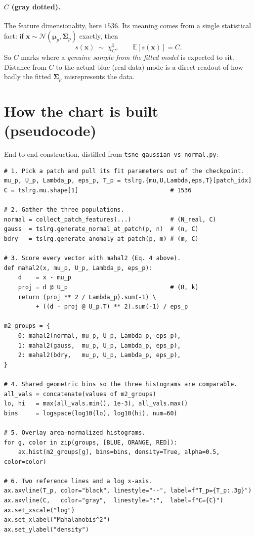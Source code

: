 \documentclass[11pt]{article}
\newcommand{\code}[1]{\texttt{#1}}
\newcommand{\bmu}{\boldsymbol{\mu}}
\newcommand{\bSigma}{\boldsymbol{\Sigma}}
\newcommand{\E}{\mathbb{E}}
\begin{document}
\paragraph{$C$ (gray dotted).}
The feature dimensionality, here $1536$. Its meaning comes from a single
statistical fact: if $\mathbf{x} \sim \mathcal{N}(\bmu_p, \bSigma_p)$ exactly,
then
\begin{equation}
  s(\mathbf{x}) \;\sim\; \chi^2_{C}, \qquad
  \E[s(\mathbf{x})] = C.
\end{equation}
So $C$ marks where a \emph{genuine sample from the fitted model} is expected to
sit. Distance from $C$ to the actual blue (real-data) mode is a direct readout
of how badly the fitted $\bSigma_p$ misrepresents the data.

\section{How the chart is built (pseudocode)}

End-to-end construction, distilled from
\code{tsne\_gaussian\_vs\_normal.py}:

\begin{lstlisting}
# 1. Pick a patch and pull its fit parameters out of the checkpoint.
mu_p, U_p, Lambda_p, eps_p, T_p = tslrg.{mu,U,Lambda,eps,T}[patch_idx]
C = tslrg.mu.shape[1]                          # 1536

# 2. Gather the three populations.
normal = collect_patch_features(...)           # (N_real, C)
gauss  = tslrg.generate_normal_at_patch(p, n)  # (n, C)
bdry   = tslrg.generate_anomaly_at_patch(p, m) # (m, C)

# 3. Score every vector with mahal2 (Eq. 4 above).
def mahal2(x, mu_p, U_p, Lambda_p, eps_p):
    d    = x - mu_p
    proj = d @ U_p                             # (B, k)
    return (proj ** 2 / Lambda_p).sum(-1) \
         + ((d - proj @ U_p.T) ** 2).sum(-1) / eps_p

m2_groups = {
    0: mahal2(normal, mu_p, U_p, Lambda_p, eps_p),
    1: mahal2(gauss,  mu_p, U_p, Lambda_p, eps_p),
    2: mahal2(bdry,   mu_p, U_p, Lambda_p, eps_p),
}

# 4. Shared geometric bins so the three histograms are comparable.
all_vals = concatenate(values of m2_groups)
lo, hi   = max(all_vals.min(), 1e-3), all_vals.max()
bins     = logspace(log10(lo), log10(hi), num=60)

# 5. Overlay area-normalized histograms.
for g, color in zip(groups, [BLUE, ORANGE, RED]):
    ax.hist(m2_groups[g], bins=bins, density=True, alpha=0.5, color=color)

# 6. Two reference lines and a log x-axis.
ax.axvline(T_p, color="black", linestyle="--", label=f"T_p={T_p:.3g}")
ax.axvline(C,   color="gray",  linestyle=":",  label=f"C={C}")
ax.set_xscale("log")
ax.set_xlabel("Mahalanobis^2")
ax.set_ylabel("density")
\end{lstlisting}
\end{document}
